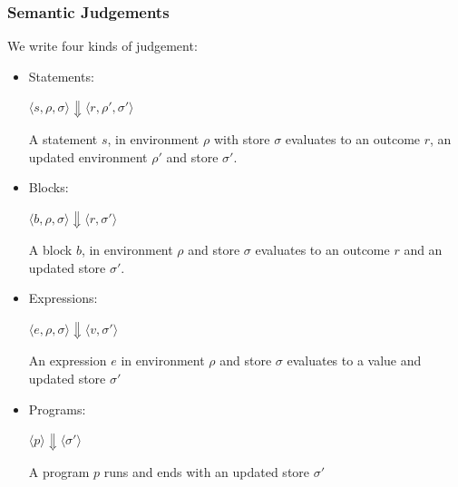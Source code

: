 \documentclass[11pt,a4paper]{article}
\newcommand{\eval}{\Downarrow}                       %
\newcommand{\config}[1]{\langle #1 \rangle}    %
\begin{document}
\subsubsection{Semantic Judgements}
We write four kinds of judgement:
\begin{itemize}
    \item Statements:

          \begin{center}
              $\config{s,\rho,\sigma}\eval\config{r,\rho',\sigma'}$
          \end{center}

          A statement $s$, in environment $\rho$ with store $\sigma$ evaluates to an outcome $r$, an updated environment $\rho'$ and store $\sigma'$.
    \item Blocks:

          \begin{center}
              $\config{b,\rho,\sigma}\eval \config{r,\sigma'}$
          \end{center}
          
          A block $b$, in environment $\rho$ and store $\sigma$ evaluates to an outcome $r$ and an updated store $\sigma'$.
    \item Expressions:

          \begin{center}
              $\config{ e, \rho, \sigma }\eval\config{ v, \sigma' }$ 
          \end{center}

          An expression $e$ in environment $\rho$ and store $\sigma$ evaluates to a value and updated store $\sigma'$
    \item Programs:
          
          \begin{center}
              $\config{p}\eval\config{\sigma'} $ 
          \end{center}

          A program $p$ runs and ends with an updated store $\sigma'$
\end{itemize}
\end{document}
